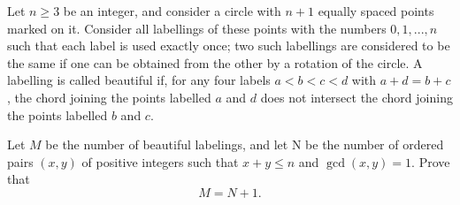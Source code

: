 Let 
$n \ge 3$
 be an integer, and consider a circle with 
$n + 1$
 equally spaced points marked on it. Consider all labellings of these points with the numbers 
$0, 1, ... , n$
 such that each label is used exactly once; two such labellings are considered to be the same if one can be obtained from the other by a rotation of the circle. A labelling is called 
beautiful
 if, for any four labels 
$a < b < c < d$
 with 
$a + d = b + c$, 
 the chord joining the points labelled 
$a$
 and 
$d$
 does not intersect the chord joining the points labelled 
$b$
 and 
$c$.


Let 
$M$
 be the number of beautiful labelings, and let N be the number of ordered pairs 
$(x, y)$
 of positive integers such that 
$x + y \le n$
 and 
$\gcd(x, y) = 1$.
 Prove that 
$$M = N + 1.$$
